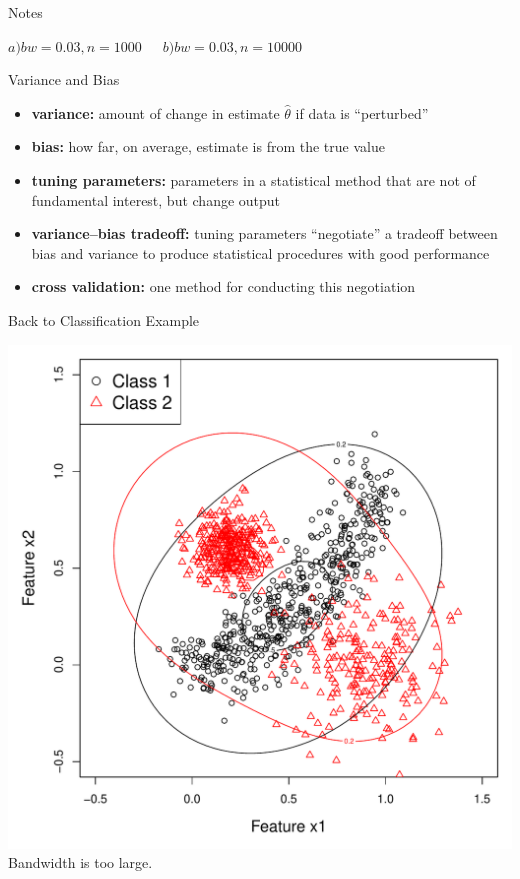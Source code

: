 \documentclass[12pt]{beamer}
\begin{document}
\begin{frame}{Notes}
\begin{itemize}
\begin{center}
      $a) bw=0.03, n = 1000 \, \, \, \, \,  \, \, \, \, b) bw=0.03, n=10000$
    \end{center}
  \end{itemize}
\end{frame}

\begin{frame}{Variance and Bias}
  \begin{itemize}
  \item \textbf{variance:} amount of change in estimate $\widehat{\theta}$  if data is ``perturbed''
  \item \textbf{bias:} how far, on average, estimate is from the true value
  \item \textbf{tuning parameters:} parameters in a statistical method that are not of fundamental interest, but change output
  \item \textbf{variance--bias tradeoff:} tuning parameters ``negotiate'' a tradeoff between bias and variance to produce statistical procedures with good performance
  \item \textbf{cross validation:} one method for conducting this negotiation
  \end{itemize}

\end{frame}



\begin{frame}{Back to Classification Example}

  \begin{center}
    \includegraphics[scale=0.4]{figs/kde2d3.pdf}\\
    Bandwidth is too large.
  \end{center}
  
\end{frame}
\end{document}
